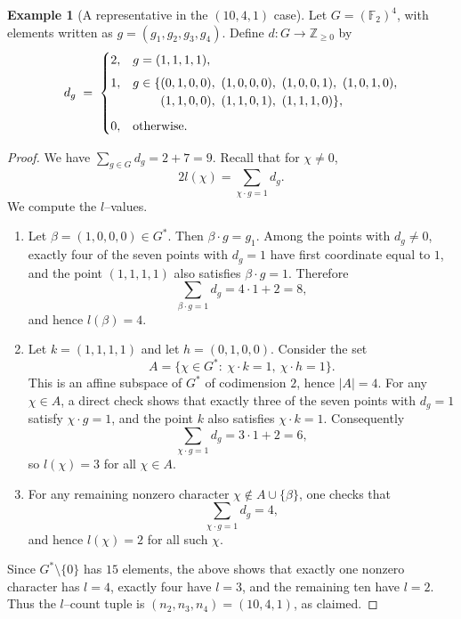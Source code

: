 \documentclass[12pt,twoside,]{amsart}
\theoremstyle{plain}
\theoremstyle{definition}
\newtheorem{example}[theorem]{Example}
\begin{document}
\begin{example}[A representative in the $(10,4,1)$ case]
Let $G=(\mathbb F_2)^4$, with elements written as $g=(g_1,g_2,g_3,g_4)$.
Define $d:G\to\mathbb Z_{\ge0}$ by
\[
d_g \;=\;
\begin{cases}
2, & g=(1,1,1,1),\\[4pt]
1, & g\in\{(0,1,0,0),\ (1,0,0,0),\ (1,0,0,1),\ (1,0,1,0),\\
   & \hphantom{g\in\{} (1,1,0,0),\ (1,1,0,1),\ (1,1,1,0)\},\\[6pt]
0, & \text{otherwise.}
\end{cases}
\]
\end{example}

\begin{proof}
We have $\sum_{g\in G} d_g = 2+7=9$.  Recall that for $\chi\neq 0$,
\[
2l(\chi)=\sum_{\chi\cdot g=1} d_g .
\]
We compute the $l$--values.

\begin{enumerate}
\item
Let $\beta=(1,0,0,0)\in G^*$. Then $\beta\cdot g=g_1$. Among the points with
$d_g\neq 0$, exactly four of the seven points with $d_g=1$ have first coordinate
equal to $1$, and the point $(1,1,1,1)$ also satisfies $\beta\cdot g=1$.
Therefore
\[
\sum_{\beta\cdot g=1} d_g = 4\cdot 1 + 2 = 8,
\]
and hence $l(\beta)=4$.

\item
Let $k=(1,1,1,1)$ and let $h=(0,1,0,0)$. Consider the set
\[
A=\{\chi\in G^*:\ \chi\cdot k=1,\ \chi\cdot h=1\}.
\]
This is an affine subspace of $G^*$ of codimension $2$, hence $|A|=4$.
For any $\chi\in A$, a direct check shows that exactly three of the seven points
with $d_g=1$ satisfy $\chi\cdot g=1$, and the point $k$ also satisfies
$\chi\cdot k=1$. Consequently
\[
\sum_{\chi\cdot g=1} d_g = 3\cdot 1 + 2 = 6,
\]
so $l(\chi)=3$ for all $\chi\in A$.

\item
For any remaining nonzero character $\chi\notin A\cup\{\beta\}$, one checks that
\[
\sum_{\chi\cdot g=1} d_g = 4,
\]
and hence $l(\chi)=2$ for all such $\chi$.
\end{enumerate}

Since $G^*\setminus\{0\}$ has $15$ elements, the above shows that exactly one
nonzero character has $l=4$, exactly four have $l=3$, and the remaining ten have
$l=2$.  Thus the $l$--count tuple is $(n_2,n_3,n_4)=(10,4,1)$, as claimed.
\end{proof}
\end{document}
